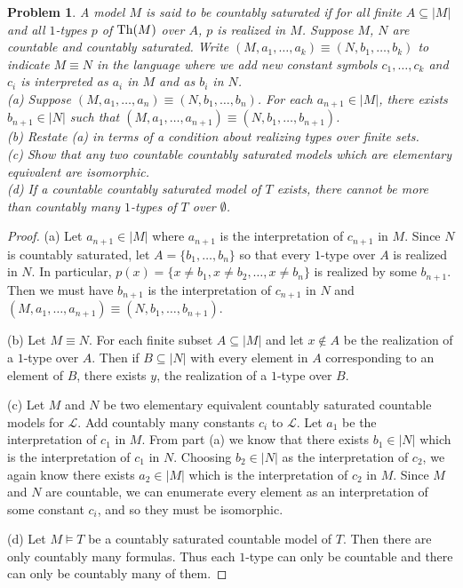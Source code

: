 \documentclass{article}
\newtheorem{problem}{Problem}
\renewcommand{\th}{\textup{Th}}
\begin{document}
\begin{problem}
A model $M$ is said to be \emph{countably saturated} if for all finite $A \subseteq |M|$ and all $1$-types $p$ of $\th(M)$ over $A$, $p$ is realized in $M$. Suppose $M$, $N$ are countable and countably saturated. Write $(M, a_1, \dots , a_k) \equiv (N, b_1, \dots , b_k)$ to indicate $M \equiv N$ in the language where we add new constant symbols $c_1, \dots , c_k$ and $c_i$ is interpreted as $a_i$ in $M$ and as $b_i$ in $N$.\\
(a) Suppose $(M, a_1, \dots , a_n) \equiv (N, b_1, \dots , b_n)$. For each $a_{n+1} \in |M|$, there exists $b_{n+1} \in |N|$ such that $(M, a_1, \dots , a_{n+1}) \equiv (N, b_1, \dots , b_{n+1})$.\\
(b) Restate (a) in terms of a condition about realizing types over finite sets.\\
(c) Show that any two countable countably saturated models which are elementary equivalent are isomorphic.\\
(d) If a countable countably saturated model of $T$ exists, there cannot be more than countably many $1$-types of $T$ over $\emptyset$.
\end{problem}
\begin{proof}
(a) Let $a_{n+1} \in |M|$ where $a_{n+1}$ is the interpretation of $c_{n+1}$ in $M$. Since $N$ is countably saturated, let $A = \{b_1, \dots , b_n\}$ so that every $1$-type over $A$ is realized in $N$. In particular, $p(x) = \{x \neq b_1, x \neq b_2, \dots , x \neq b_n\}$ is realized by some $b_{n+1}$. Then we must have $b_{n+1}$ is the interpretation of $c_{n+1}$ in $N$ and $(M, a_1, \dots , a_{n+1}) \equiv (N, b_1, \dots , b_{n+1})$.

(b) Let $M \equiv N$. For each finite subset $A \subseteq |M|$ and let $x \notin A$ be the realization of a $1$-type over $A$. Then if $B \subseteq |N|$ with every element in $A$ corresponding to an element of $B$, there exists $y$, the realization of a $1$-type over $B$.

(c) Let $M$ and $N$ be two elementary equivalent countably saturated countable models for $\mathcal{L}$. Add countably many constants $c_i$ to $\mathcal{L}$. Let $a_1$ be the interpretation of $c_1$ in $M$. From part (a) we know that there exists $b_1 \in |N|$ which is the interpretation of $c_1$ in $N$. Choosing $b_2 \in |N|$ as the interpretation of $c_2$, we again know there exists $a_2 \in |M|$ which is the interpretation of $c_2$ in $M$. Since $M$ and $N$ are countable, we can enumerate every element as an interpretation of some constant $c_i$, and so they must be isomorphic.

(d) Let $M \models T$ be a countably saturated countable model of $T$. Then there are only countably many formulas. Thus each $1$-type can only be countable and there can only be countably many of them.
\end{proof}
\end{document}
